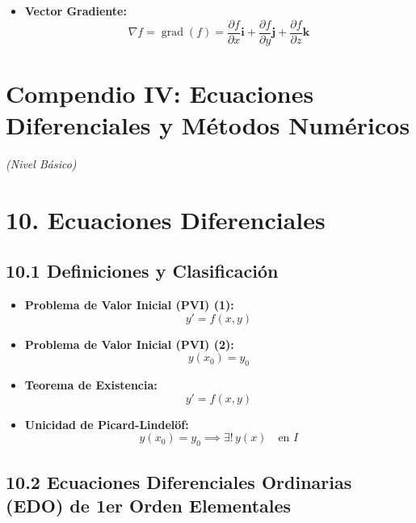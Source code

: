 \documentclass[11pt,a4paper]{article}
\begin{document}
\begin{itemize}
  \item \textbf{Vector Gradiente:}
  \[
    \nabla f = \operatorname{grad}(f) = \frac{\partial f}{\partial x}\mathbf{i} + \frac{\partial f}{\partial y}\mathbf{j} + \frac{\partial f}{\partial z}\mathbf{k}
  \]
\end{itemize}

\section*{Compendio IV: Ecuaciones Diferenciales y Métodos Numéricos}

\textit{(Nivel Básico)}

\section*{10. Ecuaciones Diferenciales}

\subsection*{10.1 Definiciones y Clasificación}

\begin{itemize}
  \item \textbf{Problema de Valor Inicial (PVI) (1):}
  \[
    y' = f(x, y)
  \]
  \item \textbf{Problema de Valor Inicial (PVI) (2):}
  \[
    y(x_0) = y_0
  \]
  \item \textbf{Teorema de Existencia:}
  \[
    y' = f(x, y)
  \]
  \item \textbf{Unicidad de Picard-Lindelöf:}
  \[
    y(x_0) = y_0 \implies \exists ! \, y(x) \quad \text{en } I
  \]
\end{itemize}

\subsection*{10.2 Ecuaciones Diferenciales Ordinarias (EDO) de 1er Orden Elementales}
\end{document}
